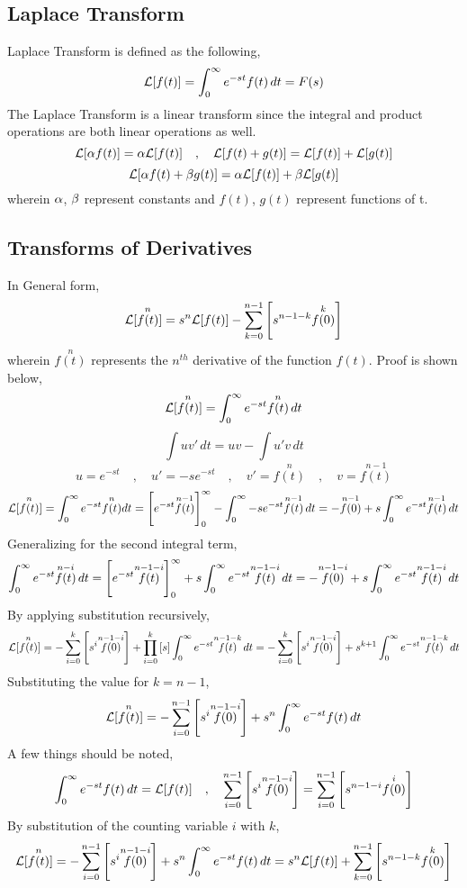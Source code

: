 \documentclass[a4paper, 12pt]{report}
\begin{document}
\begin{center}
\chapter{Laplace Transform}
\begin{comment}
Laplace Transform Header
\end{comment}
\begin{comment}
\end{comment}
Laplace Transform is defined as the following,
$$\mathcal{L}[f(t)] = \int^{\infty}_{0}e^{-st}f(t)\,dt = F(s)$$
The Laplace Transform is a linear transform since the integral and product operations are both linear operations as well.
$$\mathcal{L}[\alpha f(t)] = \alpha\mathcal{L}[f(t)]\quad,\quad\mathcal{L}[f(t) + g(t)] = \mathcal{L}[f(t)] + \mathcal{L}[g(t)]$$
$$\mathcal{L}[\alpha f(t) + \beta g(t)] = \alpha\mathcal{L}[f(t)] + \beta\mathcal{L}[g(t)]$$
wherein $\alpha$, $\beta$ represent constants and $f(t)$, $g(t)$ represent functions of t.
\section{Transforms of Derivatives}
\begin{comment}
\end{comment}
In General form,
$$\mathcal{L}[\overset{n}{f(t)}] = s^n\mathcal{L}[f(t)] - \sum^{n - 1}_{k = 0}\left[s^{n - 1 - k}\overset{k}{f(0)}\right]$$
wherein $\overset{n}{f(t)}$ represents the $n^{th}$ derivative of the function $f(t)$. Proof is shown below,
$$\mathcal{L}[\overset{n}{f(t)}] = \int^{\infty}_{0}e^{-st}\overset{n}{f(t)}\,dt$$
$$\int uv' \,dt = uv - \int u'v \,dt$$
$$u = e^{-st}\quad,\quad u' = -se^{-st} \quad,\quad v' = \overset{n}{f(t)} \quad,\quad v = \overset{n-1}{f(t)}$$
$$\mathcal{L}[\overset{n}{f(t)}] = \int^{\infty}_{0}e^{-st}\overset{n}{f(t)}dt = \left[e^{-st}\overset{n-1}{f(t)}\right]^{\infty}_{0} - \int^{\infty}_{0}-se^{-st}\overset{n-1}{f(t)} \,dt = -\overset{n-1}{f(0)} + s\int^{\infty}_{0}e^{-st}\overset{n-1}{f(t)} \,dt $$
Generalizing for the second integral term,
$$\int^{\infty}_{0}e^{-st}\overset{n-i}{f(t)} \,dt = \left[e^{-st}\overset{n-1-i}{f(t)}\right]^{\infty}_{0} + s\int^{\infty}_{0}e^{-st}\overset{n-1-i}{f(t)} \,dt = -\overset{n-1-i}{f(0)} + s\int^{\infty}_{0}e^{-st}\overset{n-1-i}{f(t)} \,dt$$
By applying substitution recursively,
$$\mathcal{L}[\overset{n}{f(t)}] = -\sum^{k}_{i = 0}\left[s^i\overset{n-1-i}{f(0)}\right] + \prod^{k}_{i = 0}\left[s\right]\int^{\infty}_{0}e^{-st}\overset{n-1-k}{f(t)} \,dt = -\sum^{k}_{i = 0}\left[s^i\overset{n-1-i}{f(0)}\right] + s^{k + 1}\int^{\infty}_{0}e^{-st}\overset{n-1-k}{f(t)} \,dt$$
Substituting the value for $k = n-1$,
$$\mathcal{L}[\overset{n}{f(t)}] = -\sum^{n-1}_{i = 0}\left[s^i\overset{n-1-i}{f(0)}\right] + s^{n}\int^{\infty}_{0}e^{-st}f(t) \,dt$$
A few things should be noted,
$$\int^{\infty}_{0}e^{-st}f(t) \,dt = \mathcal{L}[f(t)]\quad,\quad \sum^{n-1}_{i = 0}\left[s^i\overset{n-1-i}{f(0)}\right] = \sum^{n-1}_{i = 0}\left[s^{n-1-i}\overset{i}{f(0)}\right]$$
By substitution of the counting variable $i$ with $k$,
$$\mathcal{L}[\overset{n}{f(t)}] = -\sum^{n-1}_{i = 0}\left[s^i\overset{n-1-i}{f(0)}\right] + s^{n}\int^{\infty}_{0}e^{-st}f(t) \,dt = s^n \mathcal{L}[f(t)] + \sum^{n-1}_{k = 0}\left[s^{n-1-k}\overset{k}{f(0)}\right]$$

\end{center}
\end{document}
